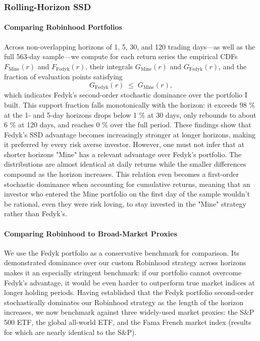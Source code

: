 \subsubsection{Rolling-Horizon SSD}
\paragraph{Comparing Robinhood Portfolios}
Across non-overlapping horizons of 1, 5, 30, and 120 trading days—as well as the full 563-day sample—we compute for each return series the empirical CDFs $F_{\mathrm{Mine}}(r)$ and $F_{\mathrm{Fedyk}}(r)$, their integrals $G_{\mathrm{Mine}}(r)$ and $G_{\mathrm{Fedyk}}(r)$, and the fraction of evaluation points satisfying  
\begin{equation}
    G_{\mathrm{Fedyk}}(r)\;\le\;G_{\mathrm{Mine}}(r),
\end{equation}
which indicates Fedyk's second-order stochastic dominance over the portfolio I built.  
This support fraction falls monotonically with the horizon: it exceeds 98 \% at the 1- and 5-day horizons drops below 1 \% at 30 days, only rebounds to about 6 \% at 120 days, and reaches 0 \% over the full period.  
These findings show that Fedyk's SSD advantage becomes increasingly stronger at longer horizons, making it preferred by every risk averse investor.
However, one must not infer that at shorter horizons "Mine" has a relevant advantage over Fedyk's portfolio.
The distributions are almost identical at daily returns while the smaller differences compound as the horizon increases.
This relation even becomes a first-order stochastic dominance when accounting for cumulative returns, meaning that an investor who entered the Mine portfolio on the first day of the sample wouldn't be rational,
even they were risk loving, to stay invested in the "Mine" strategy rather than Fedyk's.


\paragraph{Comparing Robinhood to Broad-Market Proxies}  
We use the Fedyk portfolio as a conservative benchmark for comparison. 
Its demonstrated dominance over our custom Robinhood strategy across horizons makes it an especially stringent benchmark: 
if our portfolio cannot overcome Fedyk's advantage, it would be even harder to outperform true market indices at longer holding periods. 
Having established that the Fedyk portfolio second-order stochastically dominates our Robinhood strategy as the length of the horizon increases, 
we now benchmark against three widely-used market proxies: the S\&P 500 ETF, the global all-world ETF, and the Fama French market index (results for which are nearly identical to the S\&P).

